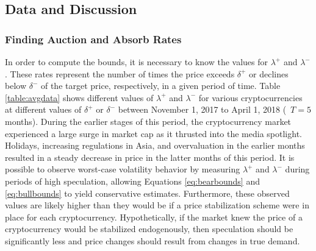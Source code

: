 \subsection{Data and Discussion}

\subsubsection{Finding Auction and Absorb Rates} \label{thresholdDiscussion}
In order to compute the bounds, it is necessary to know the values for $\lambda^+$ and $\lambda^-$. These rates represent the number of times the price exceeds $\delta^+$ or declines below $\delta^-$ of the target price, respectively, in a given period of time. Table \ref{table:avgdata} shows different values of $\lambda^+$ and $\lambda^-$ for various cryptocurrencies at different values of $\delta^+$ or $\delta^-$ between November 1, 2017 to April 1, 2018 (\ie\ $T = 5$ months). During the earlier stages of this period, the cryptocurrency market experienced a large surge in market cap as it thrusted into the media spotlight. Holidays, increasing regulations in Asia, and overvaluation in the earlier months resulted in a steady decrease in price in the latter months of this period. It is possible to observe worst-case volatility behavior by measuring $\lambda^+$ and $\lambda^-$ during periods of high speculation, allowing Equations \ref{eq:bearbounds} and \ref{eq:bullbounds} to yield conservative estimates. Furthermore, these observed values are likely higher than they would be if a price stabilization scheme were in place for each cryptocurrency. Hypothetically, if the market knew the price of a cryptocurrency would be stabilized endogenously, then speculation should be significantly less and price changes should result from changes in true demand. 

